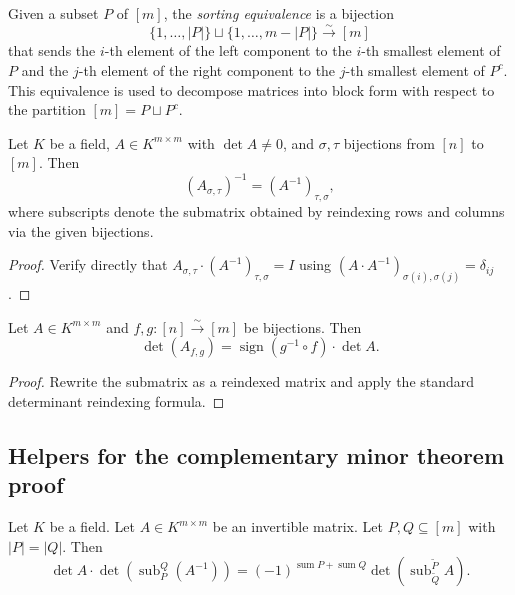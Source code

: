 \begin{definition}
\label{def.det.sortEquivPQ}
\leanhelper
\leanok
Given a subset $P$ of $[m]$, the \emph{sorting equivalence} is a bijection
\[
  \{1, \ldots, |P|\} \sqcup \{1, \ldots, m - |P|\} \xrightarrow{\sim} [m]
\]
that sends the $i$-th element of the left component to the $i$-th smallest element of $P$
and the $j$-th element of the right component to the $j$-th smallest element of $P^c$.
This equivalence is used to decompose matrices into block form with respect to the partition
$[m] = P \sqcup P^c$.
\end{definition}

\begin{lemma}
\label{lem.det.inv-submatrix-equiv}
\leanhelper
\leanok
Let $K$ be a field, $A \in K^{m \times m}$ with $\det A \neq 0$, and
$\sigma, \tau$ bijections from $[n]$ to $[m]$. Then
\[
  (A_{\sigma, \tau})^{-1} = (A^{-1})_{\tau, \sigma},
\]
where subscripts denote the submatrix obtained by reindexing rows and columns
via the given bijections.
\end{lemma}

\begin{proof}
Verify directly that $A_{\sigma,\tau} \cdot (A^{-1})_{\tau,\sigma} = I$ using
$(A \cdot A^{-1})_{\sigma(i), \sigma(j)} = \delta_{ij}$.
\end{proof}

\begin{lemma}
\label{lem.det.det-submatrix-equiv}
\leanhelper
\leanok
Let $A \in K^{m \times m}$ and $f, g : [n] \xrightarrow{\sim} [m]$
be bijections. Then
\[
  \det(A_{f, g}) = \operatorname{sign}(g^{-1} \circ f) \cdot \det A.
\]
\end{lemma}

\begin{proof}
Rewrite the submatrix as a reindexed matrix and apply the standard
determinant reindexing formula.
\end{proof}

\subsection{Helpers for the complementary minor theorem proof}

\begin{lemma}
\label{lem.det.complementary-minor-inverse}
\leanhelper
\leanok
Let $K$ be a field. Let $A \in K^{m \times m}$ be an invertible matrix.
Let $P, Q \subseteq [m]$ with $|P| = |Q|$. Then
\[
  \det A \cdot \det(\operatorname{sub}_P^Q(A^{-1}))
  = (-1)^{\operatorname{sum} P + \operatorname{sum} Q}
    \det(\operatorname{sub}_{\widetilde{Q}}^{\widetilde{P}} A).
\]
\end{lemma}


